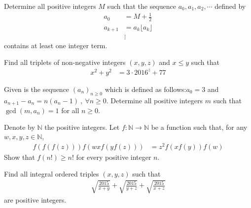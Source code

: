 \documentclass[problems.tex]{subfile}
\begin{document}
	\begin{problem}
		Determine all positive integers $M$ such that the sequence $a_0, a_1, a_2, \cdots$ defined by
			\begin{align*}
				a_0
					& = M + \frac{1}{2}\\
				a_{k+1}
					& = a_k\lfloor a_k \rfloor\\
					& \vdots
			\end{align*}
		contains at least one integer term. %
	\end{problem}

	\begin{problem}[Greece 2016]
		Find all triplets of non-negative integers $(x,y,z)$ and $x\leq y$ such that
			\begin{align*}
				x^2+y^2
					& =3 \cdot 2016^z+77
			\end{align*}
	\end{problem}

	\begin{problem}
		Given is the sequence $(a_n)_{n\geq 0}$ which is defined as follows:$a_0=3$ and $a_{n+1}-a_n=n(a_n-1) \ , \ \forall n\geq 0$. Determine all positive integers $m$ such that $\gcd (m,a_n)=1$ for all $n\geq 0$. %
	\end{problem}

	\begin{problem}
		Denote by $\mathbb{N}$ the positive integers. Let $f:\mathbb{N} \rightarrow \mathbb{N}$ be a function such that, for any $w,x,y,z \in \mathbb{N}$,
			\begin{align*}
				f(f(f(z)))f(wxf(yf(z)))
					& =z^{2}f(xf(y))f(w)
			\end{align*}
		Show that $f(n!) \ge n!$ for every positive integer $n$. %
	\end{problem}

	\begin{problem}
		Find all integral ordered triples $(x,y,z)$ such that
			\begin{align*}
				\sqrt{\frac{2015}{x+y}}+\sqrt{\frac{2015}{y+z}}+\sqrt{\frac{2015}{x+z}}
			\end{align*}
		are positive integers. %
	\end{problem}
\end{document}
